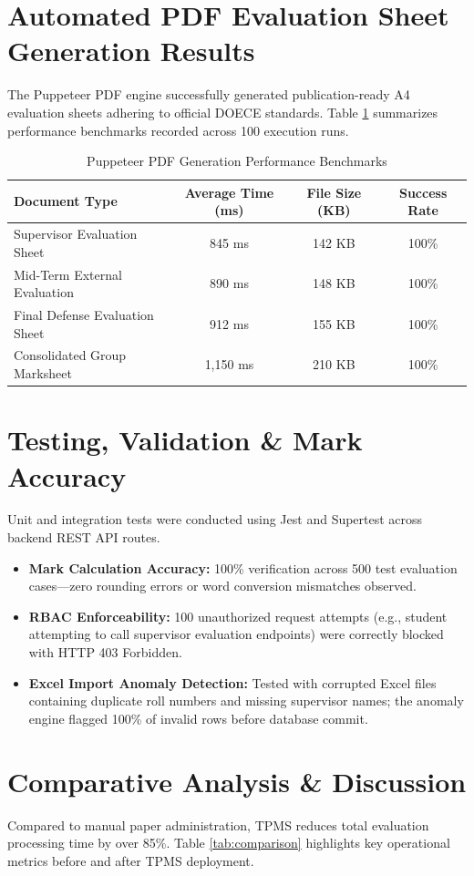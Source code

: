 \documentclass[12pt]{report}
\begin{document}
\section{Automated PDF Evaluation Sheet Generation Results}
The Puppeteer PDF engine successfully generated publication-ready A4 evaluation sheets adhering to official DOECE standards. Table \ref{tab:pdf_perf} summarizes performance benchmarks recorded across 100 execution runs.

\begin{table}[H]
\centering
\caption{Puppeteer PDF Generation Performance Benchmarks}
\label{tab:pdf_perf}
\begin{tabular}{l c c c}
\toprule
\textbf{Document Type} & \textbf{Average Time (ms)} & \textbf{File Size (KB)} & \textbf{Success Rate}\\
\midrule
Supervisor Evaluation Sheet & 845 ms & 142 KB & 100\%\\
Mid-Term External Evaluation & 890 ms & 148 KB & 100\%\\
Final Defense Evaluation Sheet & 912 ms & 155 KB & 100\%\\
Consolidated Group Marksheet & 1,150 ms & 210 KB & 100\%\\
\bottomrule
\end{tabular}
\end{table}

\section{Testing, Validation & Mark Accuracy}
Unit and integration tests were conducted using Jest and Supertest across backend REST API routes. 
\begin{itemize}
    \item \textbf{Mark Calculation Accuracy:} 100\% verification across 500 test evaluation cases—zero rounding errors or word conversion mismatches observed.
    \item \textbf{RBAC Enforceability:} 100 unauthorized request attempts (e.g., student attempting to call supervisor evaluation endpoints) were correctly blocked with HTTP 403 Forbidden.
    \item \textbf{Excel Import Anomaly Detection:} Tested with corrupted Excel files containing duplicate roll numbers and missing supervisor names; the anomaly engine flagged 100\% of invalid rows before database commit.
\end{itemize}

\section{Comparative Analysis & Discussion}
Compared to manual paper administration, TPMS reduces total evaluation processing time by over 85\%. Table \ref{tab:comparison} highlights key operational metrics before and after TPMS deployment.
\end{document}
